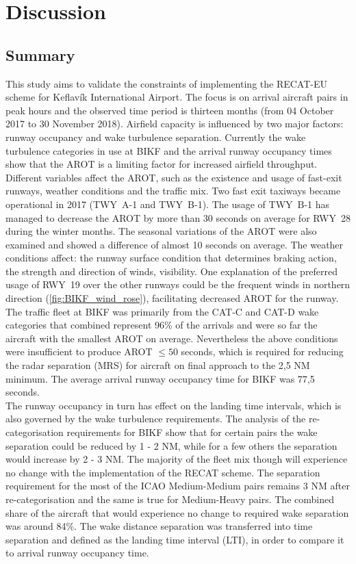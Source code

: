 


\chapter{Discussion}\label{cha:discussion}

\section{Summary}\label{sec:summary}
This study aims to validate the constraints of implementing the RECAT-EU scheme for Keflavík International Airport. The focus is on arrival aircraft pairs in peak hours and the observed time period is thirteen months (from 04 October 2017 to 30 November 2018). 
Airfield capacity is influenced by two major factors: runway occupancy and wake turbulence separation. Currently the wake turbulence categories in use at BIKF and the arrival runway occupancy times show that the AROT is a limiting factor for increased airfield throughput. Different variables affect the AROT, such as the existence and usage of fast-exit runways, weather conditions and the traffic mix. Two fast exit taxiways became operational in 2017 (TWY~A-1 and TWY~B-1). The usage of TWY~B-1 has managed to decrease the AROT by more than 30 seconds on average for RWY~28 during the winter months. The seasonal variations of the AROT were also examined and showed a difference of almost 10 seconds on average. The weather conditions affect: the runway surface condition that determines braking action, the strength and direction of winds, visibility. One explanation of the preferred usage of RWY~19 over the other runways could be the frequent winds in northern direction (\ref{fig:BIKF_wind_rose}), facilitating decreased AROT for the runway. The traffic fleet at BIKF was primarily from the CAT-C and CAT-D wake categories that combined represent 96\% of the arrivals and were so far the aircraft with the smallest AROT on average. Nevertheless the above conditions were insufficient to produce AROT $\leq 50$ seconds, which is required for reducing the radar separation (MRS) for aircraft on final approach to the 2,5 NM minimum. The average arrival runway occupancy time for BIKF was 77,5 seconds. \\
The runway occupancy in turn has effect on the landing time intervals, which is also governed by the wake turbulence requirements.
The analysis of the re-categorisation requirements for BIKF show that for certain pairs the wake separation could be reduced by 1 - 2 NM, while for a few others the separation would increase by 2 - 3 NM. The majority of the fleet mix though will experience no change with the implementation of the RECAT scheme. The separation requirement for the most of the ICAO Medium-Medium pairs remains 3 NM after re-categorisation and the same is true for Medium-Heavy pairs. The combined share of the aircraft that would experience no change to required wake separation was around 84\%. The wake distance separation was transferred into time separation and defined as the landing time interval (LTI), in order to compare it to arrival runway occupancy time.\\
